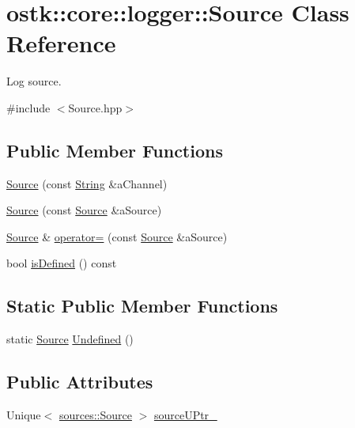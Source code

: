 \hypertarget{classostk_1_1core_1_1logger_1_1_source}{}\section{ostk\+:\+:core\+:\+:logger\+:\+:Source Class Reference}
\label{classostk_1_1core_1_1logger_1_1_source}


Log source.  




{\ttfamily \#include $<$Source.\+hpp$>$}

\subsection*{Public Member Functions}
\begin{DoxyCompactItemize}
\item 
\hyperlink{classostk_1_1core_1_1logger_1_1_source_a02ece6e1d79d574bcf5e1917dd5cc728}{Source} (const \hyperlink{classostk_1_1core_1_1types_1_1_string}{String} \&a\+Channel)
\item 
\hyperlink{classostk_1_1core_1_1logger_1_1_source_a8e1107712c9b1ab9e5506230d32c7a06}{Source} (const \hyperlink{classostk_1_1core_1_1logger_1_1_source}{Source} \&a\+Source)
\item 
\hyperlink{classostk_1_1core_1_1logger_1_1_source}{Source} \& \hyperlink{classostk_1_1core_1_1logger_1_1_source_ae6e4fbcb686bcd0b03808f31d9b30bbf}{operator=} (const \hyperlink{classostk_1_1core_1_1logger_1_1_source}{Source} \&a\+Source)
\item 
bool \hyperlink{classostk_1_1core_1_1logger_1_1_source_ad990358e832e3deb4b5d0cae908d10b7}{is\+Defined} () const
\end{DoxyCompactItemize}
\subsection*{Static Public Member Functions}
\begin{DoxyCompactItemize}
\item 
static \hyperlink{classostk_1_1core_1_1logger_1_1_source}{Source} \hyperlink{classostk_1_1core_1_1logger_1_1_source_a272a407ccc75d370b259efc685d48063}{Undefined} ()
\end{DoxyCompactItemize}
\subsection*{Public Attributes}
\begin{DoxyCompactItemize}
\item 
Unique$<$ \hyperlink{classostk_1_1core_1_1logger_1_1sources_1_1_source}{sources\+::\+Source} $>$ \hyperlink{classostk_1_1core_1_1logger_1_1_source_abbe1b964fe5f7a462fb8ab67f2007662}{source\+U\+Ptr\+\_\+}
\end{DoxyCompactItemize}


